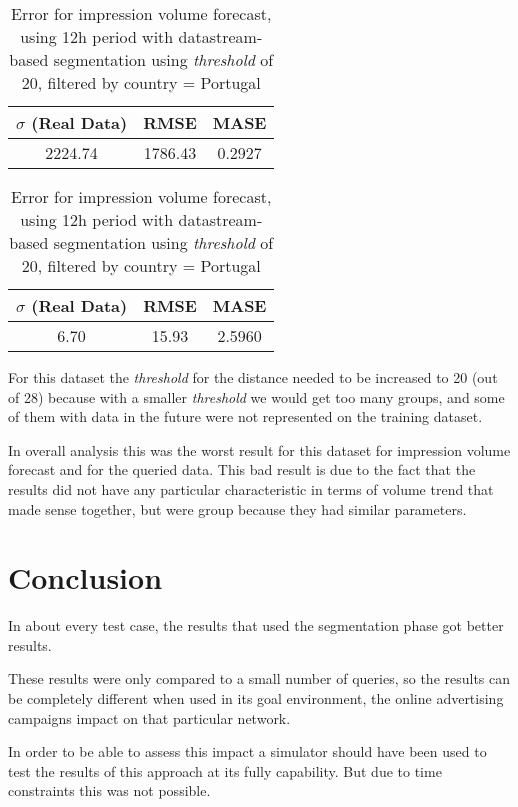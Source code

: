 \begin{table}[!ht]
\centering
\footnotesize
\begin{minipage}[t]{0.45\linewidth}
\centering
\footnotesize
\begin{tabular}{ccc}
 $\sigma$ (Real Data) & RMSE & MASE   \\ \hline
2224.74 & 1786.43 & 0.2927 \\
\end{tabular}

\vspace{0.5cm}

\caption[Volume
impression forecast, real data, datastream]{Error for impression volume
forecast, using 12h period with datastream-based segmentation using
\emph{threshold} of 20}
\label{tab:err_forecast_12_real_datastream_filtered}
\end{minipage}
\quad
\begin{minipage}[t]{0.45\linewidth}
\centering
\footnotesize
\begin{tabular}{ccc}
 $\sigma$ (Real Data) & RMSE & MASE   \\ \hline
6.70 & 15.93 & 2.5960 \\
\end{tabular}

\vspace{0.5cm}

\caption[Volume
impression forecast, real data, datastream, filtered]{Error for impression volume
forecast, using 12h period with datastream-based segmentation using
\emph{threshold} of 20, filtered by country = Portugal}
\label{tab:err_forecast_12_real_datastream_filtered}
\end{minipage}

\end{table}

For this dataset the \emph{threshold} for the distance needed to be increased to
20 (out of 28) because with a smaller \emph{threshold} we would get too many
groups, and some of them with data in the future were not represented on the training
dataset.

In overall analysis this was the worst result for this dataset for impression
volume forecast and for the queried data. This bad result is due to the fact that the results did not have
any particular characteristic in terms of
volume trend that made sense together, but were group because they had similar
parameters.

\section{Conclusion}

In about every test case, the results that used the segmentation phase got better
results.

These results were only compared to a small number of queries, so the results can
be completely different when used in its goal environment, the
online advertising campaigns impact on that particular network.

In order to be able to assess this impact a simulator should have been used to
test the results of this approach at its fully capability. But due to time
constraints this was not possible.
